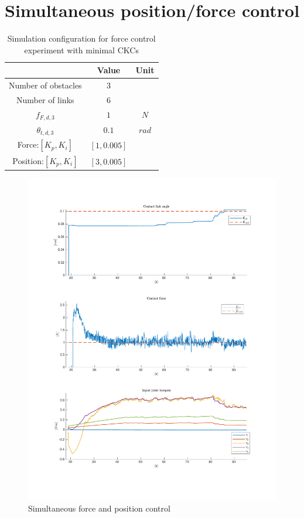 \section{Simultaneous position/force control}\label{sec:pos-force-control-exp}

\begin{table}[]
    \centering
    \begin{tabular}{|c|c|c|}
        \hline
        & Value & Unit\\
        \hline
        Number of obstacles & $3$ & \\
        Number of links & $6$ & \\
        $f_{F,d,3}$ & $1$ & $N$ \\
        $\theta_{t,d,3}$ & $0.1$ & $rad$ \\
        Force:$[K_{p}, K_{i}]$ & $[1, 0.005]$ &\\
        Position:$[K_{p}, K_{i}]$ & $[3, 0.005]$ &\\
        \hline
    \end{tabular}
    \caption{Simulation configuration for force control experiment with minimal CKCs}
    \label{tab:p+f}
\end{table}

\begin{figure}
    \centering
    \includegraphics[trim=2.1cm 2.1cm 2.1cm 2.1cm, clip=true, width=\textwidth]{figures/experiments/pos+f/pf-ref-3.pdf}
    \caption{Simultaneous force and position control}
    \label{fig:p+f}
\end{figure}